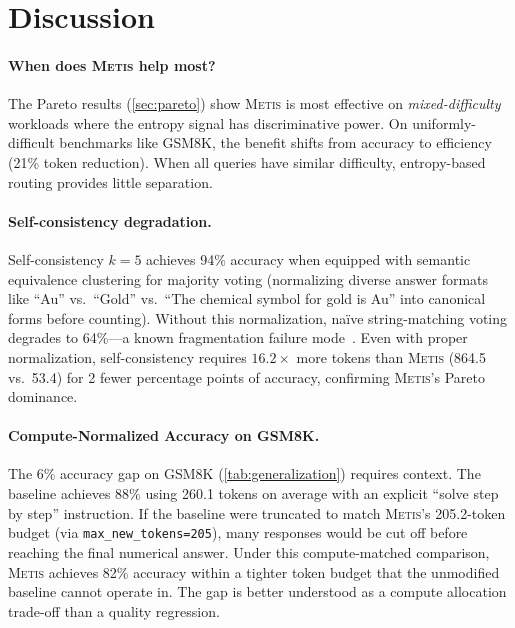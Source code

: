 \documentclass[11pt,a4paper]{article}
\newcommand{\metis}{\textsc{Metis}}
\begin{document}
\section{Discussion}
\label{sec:discussion}

\paragraph{When does \metis{} help most?}
The Pareto results (\cref{sec:pareto}) show \metis{} is most effective on \emph{mixed-difficulty} workloads where the entropy signal has discriminative power. On uniformly-difficult benchmarks like GSM8K, the benefit shifts from accuracy to efficiency (21\% token reduction). When all queries have similar difficulty, entropy-based routing provides little separation.

\paragraph{Self-consistency degradation.}
Self-consistency $k{=}5$ achieves 94\% accuracy when equipped with semantic equivalence clustering for majority voting (normalizing diverse answer formats like ``Au'' vs.\ ``Gold'' vs.\ ``The chemical symbol for gold is Au'' into canonical forms before counting). Without this normalization, na\"ive string-matching voting degrades to 64\%---a known fragmentation failure mode~\citep{wang2022self}. Even with proper normalization, self-consistency requires $16.2\times$ more tokens than \metis{} (864.5 vs.\ 53.4) for 2 fewer percentage points of accuracy, confirming \metis{}'s Pareto dominance.

\paragraph{Compute-Normalized Accuracy on GSM8K.}
The 6\% accuracy gap on GSM8K (\cref{tab:generalization}) requires context. The baseline achieves 88\% using 260.1 tokens on average with an explicit ``solve step by step'' instruction. If the baseline were truncated to match \metis{}'s 205.2-token budget (via \texttt{max\_new\_tokens=205}), many responses would be cut off before reaching the final numerical answer. Under this compute-matched comparison, \metis{} achieves 82\% accuracy within a tighter token budget that the unmodified baseline cannot operate in. The gap is better understood as a compute allocation trade-off than a quality regression.
\end{document}
